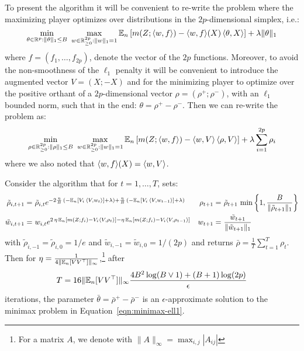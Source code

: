 To present the algorithm it will be convenient to re-write the problem where the maximizing player optimizes over distributions in the $2p$-dimensional simplex, i.e.:
\begin{equation}
    \min_{\theta\in \mathbb{R}^p: \|\theta\|_1\leq B}\,\, \max_{w\in \mathbb{R}_{\geq 0}^{2p}:\|w\|_1=1} \mathbb{E}_n\left[m(Z; \langle w, f \rangle) - \langle w, f \rangle(X)\, \langle \theta, X \rangle \right] + \lambda \|\theta\|_1
\end{equation}
 where $f=(f_1, \ldots, f_{2p})$, denote the vector of the $2p$ functions. Moreover, to avoid the non-smoothness of the $\ell_1$ penalty it will be convenient to introduce the augmented vector $V=(X; -X)$ and for the minimizing player to optimize over the positive orthant of a $2p$-dimensional vector $\rho=(\rho^+; \rho^-)$, with an $\ell_1$ bounded norm, such that in the end: $\theta=\rho^+ - \rho^-$. Then we can re-write the problem as:
\begin{equation}
    \min_{\rho\in \mathbb{R}_{\geq 0}^{2p}: \|\rho\|_1\leq B}\,\, \max_{w\in \mathbb{R}_{\geq 0}^{2p}:\|w\|_1=1} \mathbb{E}_n\left[m(Z; \langle w, f \rangle) - \langle w, V \rangle\, \langle \rho, V \rangle \right] + \lambda \sum_{i=1}^{2p} \rho_i
\end{equation}
where we also noted that $\langle w, f \rangle(X) = \langle w, V \rangle$.
\begin{proposition}\label{prop:sparse-optimization-ell1}
Consider the algorithm that for $t=1, \ldots, T$, sets:
\begin{align}
    \tilde{\rho}_{i, t+1} =~& \tilde{\rho}_{i, t} e^{- 2\frac{\eta}{B}\, \left(- \mathbb{E}_n[V_i\, \langle V, w_t \rangle] + \lambda\right) + \frac{\eta}{B}\, \left(- \mathbb{E}_n[V_i\, \langle V, w_{t-1} \rangle] + \lambda\right)} &
    \rho_{t+1} =~& \tilde{\rho}_{t+1}\, \min\left\{1, \frac{B}{\|\tilde{\rho}_{t+1}\|_1}\right\}\\
    \tilde{w}_{i, t+1} =~& w_{i, t} e^{2\, \eta\, \mathbb{E}_n[m(Z; f_i) - V_i \langle V, \rho_t \rangle] - \eta\, \mathbb{E}_n[m(Z; f_i) - V_i \langle V, \rho_{t-1} \rangle]} & w_{t+1} =~& \frac{\tilde{w}_{t+1}}{\|\tilde{w}_{t+1}\|_1}
\end{align}
with $\tilde{\rho}_{i,-1}=\tilde{\rho}_{i,0}=1/e$ and $\tilde{w}_{i,-1}=\tilde{w}_{i,0}=1/(2p)$ and returns $\bar{\rho}=\frac{1}{T} \sum_{t=1}^T \rho_t$. Then for $\eta=\frac{1}{4\|\mathbb{E}_n[VV^\top]\|_{\infty}}$,\footnote{For a matrix $A$, we denote with $\|A\|_{\infty}=\max_{i, j} |A_{ij}|$} after
\begin{equation}
T=16\|\mathbb{E}_n[VV^\top]\|_{\infty} \frac{4B^2 \log(B\vee 1) + (B+1) \log(2p)}{\epsilon}
\end{equation}
iterations, the parameter $\bar{\theta}=\bar{\rho}^{+} - \bar{\rho}^-$ is an $\epsilon$-approximate solution to the minimax problem in Equation~\eqref{eqn:minimax-ell1}.
\end{proposition}


